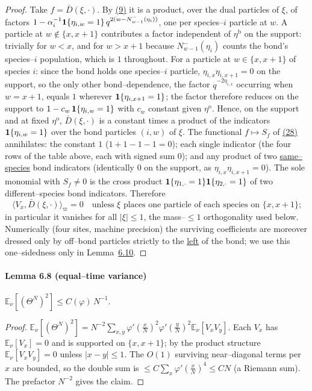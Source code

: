 \documentclass[11pt]{article}
\theoremstyle{plain}
\theoremstyle{definition}
\theoremstyle{remark}
\newcommand{\E}{\mathbb{E}}\newcommand{\PP}{\mathbb{P}}\newcommand{\dd}{\,\mathrm{d}}
\begin{document}
\begin{proof}
Take $f=\bar D(\xi,\cdot)$. By \hyperref[eq_Dreu]{(9)} it is a product, over the dual particles of
$\xi$, of factors $1-\alpha_i^{-1}\mathbf 1\{\eta_{i,w}=1\}\,q^{2(w-N^-_{w-1}(\eta_i))}$, one
per species--$i$ particle at $w$. A particle at $w\notin\{x,x+1\}$ contributes a factor
independent of $\eta^{\mathrm b}$ on the support: trivially for $w<x$, and for $w>x+1$
because $N^-_{w-1}(\eta_i)$ counts the bond's species--$i$ population, which is $1$
throughout. For a particle at $w\in\{x,x+1\}$ of species $i$: since the bond holds one
species--$i$ particle, $\eta_{i,x}\eta_{i,x+1}=0$ on the support, so the only other
bond--dependence, the factor $q^{-2\eta_{i,x}}$ occurring when $w=x+1$, equals $1$
wherever $\mathbf 1\{\eta_{i,x+1}=1\}$; the factor therefore reduces on the support to
$1-c_w\,\mathbf 1\{\eta_{i,w}=1\}$ with $c_w$ constant given $\eta^{\mathrm o}$. Hence, on the
support and at fixed $\eta^{\mathrm o}$, $\bar D(\xi,\cdot)$ is a constant times a product
of the indicators $\mathbf 1\{\eta_{i,w}=1\}$ over the bond particles $(i,w)$ of $\xi$.
The functional $f\mapsto S_f$ of \hyperref[eq_Vorthid]{(28)} annihilates: the constant $1$
($1+1-1-1=0$); each single indicator (the four rows of the table above, each with signed
sum $0$); and any product of two \underline{same--species} bond indicators (identically $0$ on
the support, as $\eta_{i,x}\eta_{i,x+1}=0$). The sole monomial with $S_f\ne0$ is the
cross product $\mathbf 1\{\eta_{1,\cdot}=1\}\mathbf 1\{\eta_{2,\cdot}=1\}$ of two
different--species bond indicators. Therefore
\[
  \langle V_x,\bar D(\xi,\cdot)\rangle_\varpi=0
  \quad\text{unless $\xi$ places one particle of each species on $\{x,x+1\}$;}
\]
in particular it vanishes for all $|\xi|\le1$, the mass--$\le1$ orthogonality used below.
Numerically (four sites, machine precision) the surviving coefficients are moreover
dressed only by off--bond particles strictly to the \underline{left} of the bond; we use this
one--sidedness only in Lemma~\hyperref[lem_eps]{6.10}.
\end{proof}

\paragraph{Lemma 6.8 (equal--time variance)}\label{lem_eqvar}

$\E_\nu[(\Theta^N)^2]\le C(\varphi)\,N^{-1}$.
\par
\begin{proof}
$\E_\nu[(\Theta^N)^2]=N^{-2}\sum_{x,y}\varphi'(\tfrac xN)^2\varphi'(\tfrac yN)^2\E_\nu[V_xV_y]$.
Each $V_x$ has $\E_\nu[V_x]=0$ and is supported on $\{x,x+1\}$; by the product structure
$\E_\nu[V_xV_y]=0$ unless $|x-y|\le1$. The $O(1)$ surviving near--diagonal terms per $x$
are bounded, so the double sum is $\le C\sum_x\varphi'(\tfrac xN)^4\le CN$ (a Riemann
sum). The prefactor $N^{-2}$ gives the claim.
\end{proof}
\end{document}

